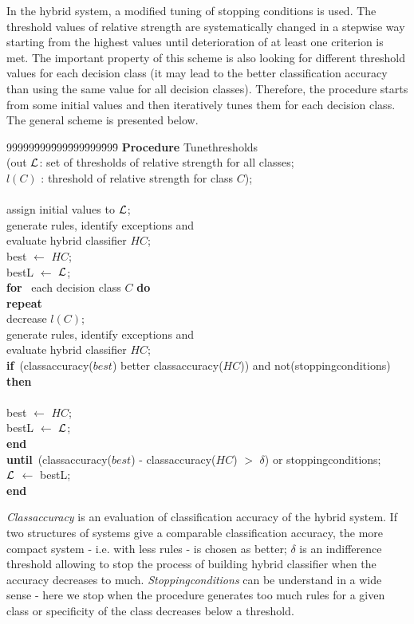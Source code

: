 \documentclass{article}
\newcommand{\bo}{\footnotesize \bf}
\newcommand{\no}{\footnotesize}
\newenvironment{algo}{\newcommand{\B}{{\bo begin}}
\newcommand{\DO}{{\bo do}~} \newcommand{\E}{{\bo end}}
\newcommand{\FOR}{{\bo for}~} \newcommand{\IF}{{\bo if}~}
\newcommand{\THEN}{{\bo then}~} \newcommand{\ELSE}{{\bo else}~}
\newcommand{\REPEAT}{{\bo repeat}~}
\newcommand{\UNTIL}{{\bo until}~}
\small
\no \begin{tabbing}
99999\= 999\= 999\= 999\= 999\= 999\= \+ \+ \kill}{\end{tabbing}
\normalsize}
\begin{document}
In the hybrid system, a modified tuning of stopping conditions is
used. The threshold values of relative strength are systematically
changed in a stepwise way starting from the highest values until
deterioration of at least one criterion is met. The important
property of this scheme is also looking for different threshold
values for each decision class (it may lead to the better
classification accuracy than using the same value for all decision
classes). Therefore, the procedure starts from some initial values
and then iteratively tunes them for each decision class. The
general scheme is presented below.

\begin{algo}
\< \< {\bf Procedure} Tunethresholds\\ \< \<(out $\cal L$: set of
thresholds of relative strength for all classes;\\ \<  $l(C)$ :
threshold of relative strength for class $C$); \\ \< \< \B \\ \<
assign initial values to $\cal L$;\\ \< generate rules, identify
exceptions and \\ \< evaluate hybrid classifier $HC$;\\ \< best
$\leftarrow$ $HC$;\\ \< bestL $\leftarrow$ $\cal L$;\\ \< \FOR
each decision class $C$ \DO \\ \< \REPEAT \\ decrease $l(C)$;\\
generate rules, identify exceptions and \\ evaluate hybrid
classifier $HC$;\\ \IF (classaccuracy($best$) better
classaccuracy($HC$)) and not(stoppingconditions) \THEN \\ \> \B \\
\> \> best $\leftarrow$ $HC$;\\ \> \> bestL $\leftarrow$ $\cal
L$;\\ \> \E \\ \< \UNTIL (classaccuracy($best$) -
classaccuracy($HC$) $>$ $\delta$) or stoppingconditions;\\ \<
$\cal L$ $\leftarrow$ bestL;\\ \< \< \E
\end{algo}


{\em Classaccuracy} is an evaluation of classification accuracy of
the hybrid system. If two structures of systems give a comparable
classification accuracy, the more compact system - i.e. with less
rules - is chosen as better; $\delta$ is an indifference threshold
allowing to stop the process of building hybrid classifier when
the accuracy decreases to much. {\em Stoppingconditions} can be
understand in a wide sense - here we stop when the procedure
generates too much rules for a given class or specificity of the
class decreases below a threshold.
\end{document}

